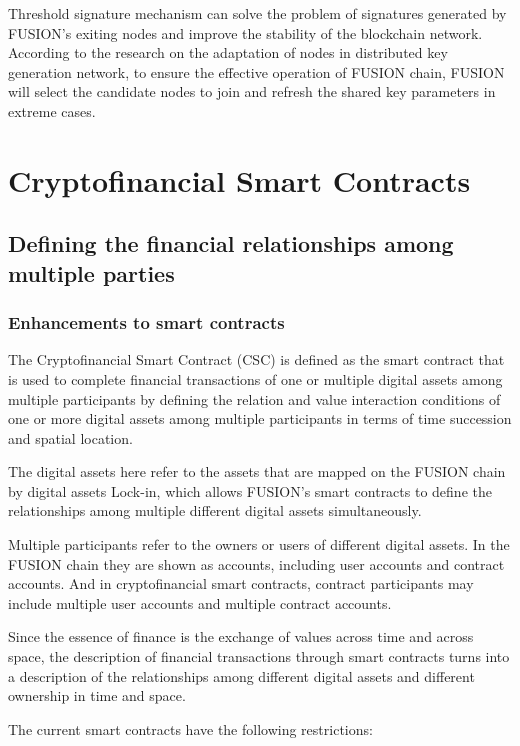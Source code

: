 \documentclass[a4paper,12pt]{article}
\begin{document}
Threshold signature mechanism can solve the problem of signatures generated by FUSION's exiting nodes and improve the stability of the blockchain network. According to the research on the adaptation of nodes in distributed key generation network\citep{Zhajun2010}, to ensure the effective operation of FUSION chain, FUSION will select the candidate nodes to join and refresh the shared key parameters in extreme cases.


\section{Cryptofinancial Smart Contracts}

\subsection{Defining the financial relationships among multiple parties}

\subsubsection{Enhancements to smart contracts}

The Cryptofinancial Smart Contract (CSC) is defined as the smart contract that is used to complete financial transactions of one or multiple digital assets among multiple participants by defining the relation and value interaction conditions of one or more digital assets among multiple participants in terms of time succession and spatial location.

The digital assets here refer to the assets that are mapped on the FUSION chain by digital assets Lock-in, which allows FUSION's smart contracts to define the relationships among multiple different digital assets simultaneously.

Multiple participants refer to the owners or users of different digital assets. In the FUSION chain they are shown as accounts, including user accounts and contract accounts. And in cryptofinancial smart contracts, contract participants may include multiple user accounts and multiple contract accounts.

Since the essence of finance is the exchange of values across time and across space, the description of financial transactions through smart contracts turns into a description of the relationships among different digital assets and different ownership in time and space.

The current smart contracts have the following restrictions:
\end{document}

